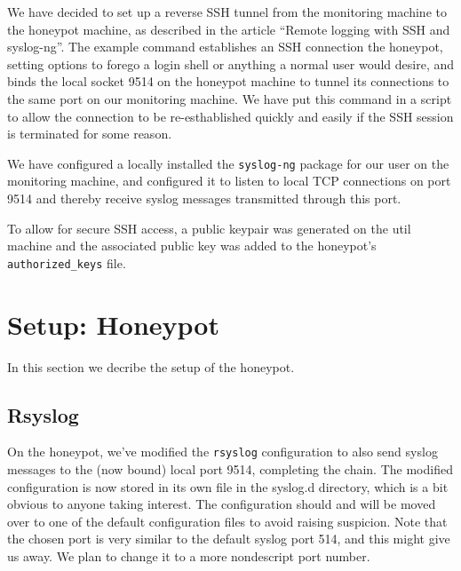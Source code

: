 \documentclass[11pt]{article} %
\begin{document}
We have decided to set up a reverse SSH tunnel from the monitoring machine to the honeypot machine, as described in the article ``Remote logging with SSH and syslog-ng''. \cite{remote_logging}
The example command establishes an SSH connection the honeypot, setting options to forego a login shell or anything a normal user would desire, and binds the local socket 9514 on the honeypot machine to tunnel its connections to the same port on our monitoring machine.
We have put this command in a script to allow the connection to be re-esthablished quickly and easily if the SSH session is terminated for some reason. 

We have configured a locally installed the \verb|syslog-ng| package for our user on the monitoring machine, and configured it to listen to local TCP connections on port 9514 and thereby receive syslog messages transmitted through this port.

To allow for secure SSH access, a public keypair was generated on the util machine and the associated public key was added to the honeypot's \verb|authorized_keys| file.



\section{Setup: Honeypot}

In this section we decribe the setup of the honeypot.

\subsection{Rsyslog}
On the honeypot, we've modified the \verb|rsyslog| configuration to also send syslog messages to the (now bound) local port 9514, completing the chain.
The modified configuration is now stored in its own file in the syslog.d directory, which is a bit obvious to anyone taking interest.
The configuration should and will be moved over to one of the default configuration files to avoid raising suspicion.
Note that the chosen port is very similar to the default syslog port 514, and this might give us away.
We plan to change it to a more nondescript port number.
\end{document}
